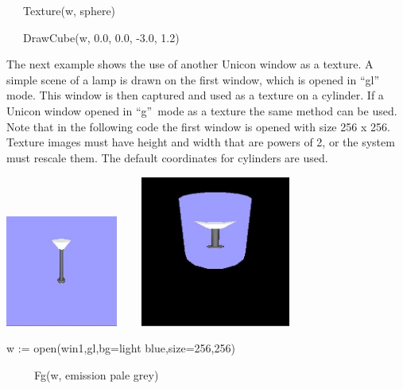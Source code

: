 \documentclass[letterpaper]{article}
\begin{document}
{{\sffamily
\ \ \ Texture(w, sphere)}

{\sffamily
\ \ \ DrawCube(w, 0.0, 0.0, -3.0, 1.2)}


\bigskip

{
The next example shows the use of another Unicon window as a texture. A simple scene of a lamp is drawn on the first
window, which is opened in \textsf{{}``gl''} mode. This window is then captured and used as a texture on a cylinder. If
a Unicon window opened in \textsf{{}``g''}\texttt{ }mode as a texture the same method can be used. Note that in the
following code the first window is opened with size 256 x 256. Texture images must have height and width that are
powers of 2, or the system must rescale them. The default coordinates for cylinders are used.}


\bigskip


\bigskip

{\centering{}
 \includegraphics[width=1.4492in,height=1.4335in]{utr9/utr9-img028.jpg} \texttt{ \ \ }
\includegraphics[width=1.939in,height=1.952in]{utr9/utr9-img029.jpg} \texttt{ \ \ }
\par}


\bigskip


\bigskip

{\sffamily
w := open({\textquotedbl}win1{\textquotedbl},{\textquotedbl}gl{\textquotedbl},{\textquotedbl}bg=light
blue{\textquotedbl},{\textquotedbl}size=256,256{\textquotedbl})}

{\sffamily
\ \ \ \ \ Fg(w, {\textquotedbl}emission pale grey{\textquotedbl})}

}
\end{document}
